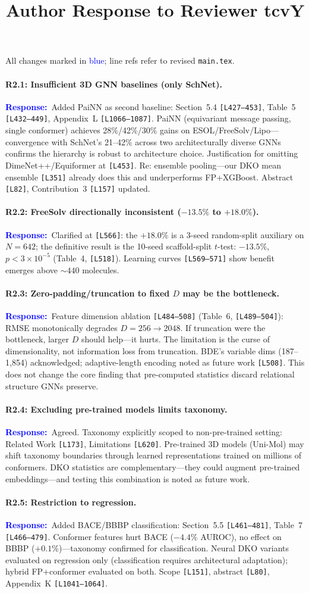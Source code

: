 \documentclass[11pt]{article}
\title{Author Response to Reviewer tcvY}
\author{}
\date{}
\newcommand{\point}[1]{\paragraph{#1}}
\newcommand{\response}{\textcolor{blue}{\textbf{Response:}}~}
\newcommand{\lines}[1]{\texttt{[L#1]}}
\begin{document}
\maketitle
\vspace{-2em}

All changes marked in \textcolor{blue}{blue}; line refs refer to revised \texttt{main.tex}.

\point{R2.1: Insufficient 3D GNN baselines (only SchNet).}

\response Added PaiNN as second baseline: Section~5.4 \lines{427--453}, Table~5 \lines{432--449}, Appendix~L \lines{1066--1087}. PaiNN (equivariant message passing, single conformer) achieves 28\%/42\%/30\% gains on ESOL/FreeSolv/Lipo---convergence with SchNet's 21--42\% across two architecturally diverse GNNs confirms the hierarchy is robust to architecture choice. Justification for omitting DimeNet++/Equiformer at \lines{453}. Re: ensemble pooling---our DKO mean ensemble \lines{351} already does this and underperforms FP+XGBoost. Abstract \lines{82}, Contribution~3 \lines{157} updated.

\point{R2.2: FreeSolv directionally inconsistent ($-13.5\%$ to $+18.0\%$).}

\response Clarified at \lines{566}: the $+18.0\%$ is a 3-seed random-split auxiliary on $N{=}642$; the definitive result is the 10-seed scaffold-split $t$-test: $-13.5\%$, $p < 3{\times}10^{-5}$ (Table~4, \lines{518}). Learning curves \lines{569--571} show benefit emerges above ${\sim}440$ molecules.

\point{R2.3: Zero-padding/truncation to fixed $D$ may be the bottleneck.}

\response Feature dimension ablation \lines{484--508} (Table~6, \lines{489--504}): RMSE monotonically degrades $D{=}256 \to 2048$. If truncation were the bottleneck, larger $D$ should help---it hurts. The limitation is the curse of dimensionality, not information loss from truncation. BDE's variable dims (187--1,854) acknowledged; adaptive-length encoding noted as future work \lines{508}. This does not change the core finding that pre-computed statistics discard relational structure GNNs preserve.

\point{R2.4: Excluding pre-trained models limits taxonomy.}

\response Agreed. Taxonomy explicitly scoped to non-pre-trained setting: Related Work \lines{173}, Limitations \lines{620}. Pre-trained 3D models (Uni-Mol) may shift taxonomy boundaries through learned representations trained on millions of conformers. DKO statistics are complementary---they could augment pre-trained embeddings---and testing this combination is noted as future work.

\point{R2.5: Restriction to regression.}

\response Added BACE/BBBP classification: Section~5.5 \lines{461--481}, Table~7 \lines{466--479}. Conformer features hurt BACE ($-4.4\%$ AUROC), no effect on BBBP ($+0.1\%$)---taxonomy confirmed for classification. Neural DKO variants evaluated on regression only (classification requires architectural adaptation); hybrid FP+conformer evaluated on both. Scope \lines{151}, abstract \lines{80}, Appendix~K \lines{1041--1064}.
\end{document}
